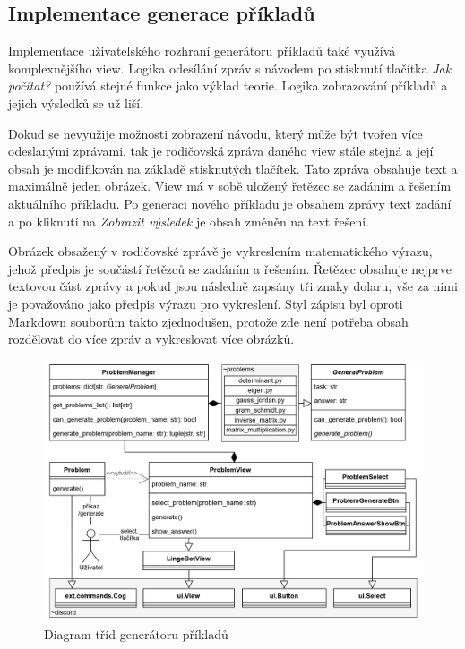 \documentclass[FM]{tulthesis}
\begin{document}
	\subsection{Implementace generace příkladů}
	
	Implementace uživatelského rozhraní generátoru příkladů také využívá komplexnějšího view. Logika odesílání zpráv s návodem po stisknutí tlačítka \textit{Jak počítat?} používá stejné funkce jako výklad teorie. Logika zobrazování příkladů a jejich výsledků se už liší.
	
	Dokud se nevyužije možnosti zobrazení návodu, který může být tvořen více odeslanými zprávami, tak je rodičovská zpráva daného view stále stejná a její obsah je modifikován na základě stisknutých tlačítek. Tato zpráva obsahuje text a maximálně jeden obrázek. View má v sobě uložený řetězec se zadáním a řešením aktuálního příkladu. Po generaci nového příkladu je obsahem zprávy text zadání a po kliknutí na \textit{Zobrazit výsledek} je obsah změněn na text řešení.
	
	Obrázek obsažený v rodičovské zprávě je vykreslením matematického výrazu, jehož předpis je součástí řetězců se zadáním a řešením. Řetězec obsahuje nejprve textovou část zprávy a pokud jsou následně zapsány tři znaky dolaru, vše za nimi je považováno jako předpis výrazu pro vykreslení. Styl zápisu byl oproti \mbox{Markdown} souborům takto zjednodušen, protože zde není potřeba obsah rozdělovat do více zpráv a vykreslovat více obrázků.
	
	\begin{figure}[ht]
		\centering
		\includegraphics[width=\textwidth]{img/ProblemsDiagram}
		\caption{Diagram tříd generátoru příkladů}
		\label{_tag_img_problemuml}
	\end{figure}
	
\end{document}
